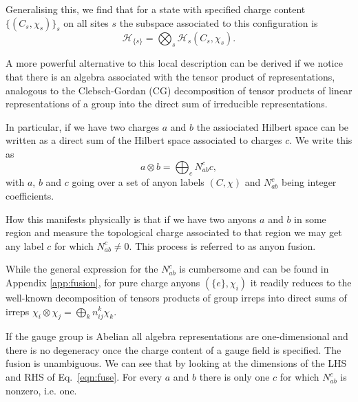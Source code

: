 \documentclass[two column]{article}
\begin{document}
Generalising this, we find that for a state with specified charge content $\{(C_s, \chi_s)\}_s$ on all sites $s$ the subspace associated to this configuration is
\begin{equation}
	\mathcal{H}_{\{s\}} = \bigotimes_s \mathcal H_s (C_s, \chi_s).
\end{equation}

A more powerful alternative to this local description can be derived if we notice that
there is an algebra associated with the tensor product of representations, analogous to the Clebsch-Gordan (CG) decomposition of tensor products of linear representations of a group into the direct sum of irreducible representations. 

In particular, if we have two charges $a$ and $b$ the assiociated Hilbert space can be written as a direct sum of the Hilbert space associated to charges $c$. We write this as 
\begin{equation}
	a \otimes b = \bigoplus_{c}N^c_{ab} c,\label{eqn:fuse} 
\end{equation}
with $a$, $b$ and $c$ going over a set of anyon labels $(C, \chi)$ and $N_{ab}^c$ being integer coefficients. 



How this manifests physically is that if we have two anyons $a$ and $b$ in some region and measure the topological charge associated to that region we may get any label $c$ for which $N_{ab}^c \neq 0$. This process is referred to as anyon fusion.

While the general expression for the $N_{ab}^c$ is cumbersome and can be found in Appendix \ref{app:fusion}, for pure charge anyons $(\{e\}, \chi_i)$ it readily reduces to the well-known  decomposition of tensors products of group irreps into direct sums of irreps $\chi_i\otimes\chi_j = \bigoplus_k n^k_{ij} \chi_k$.

If the gauge group is Abelian all algebra representations are one-dimensional and there is no degeneracy once the charge content of a gauge field is specified. The fusion is unambiguous. 
We can see that by looking at the dimensions of the LHS and RHS of Eq.~\eqref{eqn:fuse}. For every $a$ and $b$ there is only one $c$ for which $N_{ab}^c$ is nonzero, i.e. one.
\end{document}
